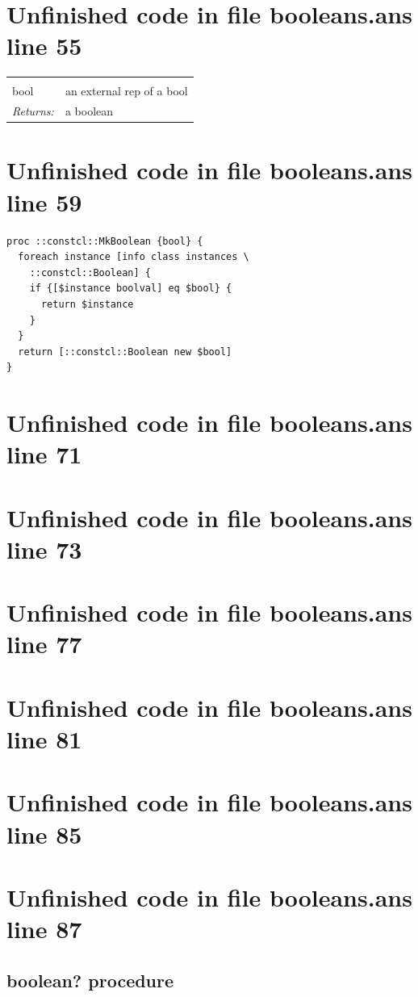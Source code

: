 \documentclass[twoside,9pt]{report}
\begin{document}
\section{Unfinished code in file booleans.ans line 55}
\noindent\begin{tabular}{ |p{1.9cm} p{8cm}| }
\hline
\rowcolor[HTML]{CCCCCC} \multicolumn{2}{|l|}{\bf MkBoolean (internal)} \\
bool & an external rep of a bool \\
\textit{Returns:} & a boolean \\
\hline
\end{tabular}
\section{Unfinished code in file booleans.ans line 59}
\begin{lstlisting}
proc ::constcl::MkBoolean {bool} {
  foreach instance [info class instances \
    ::constcl::Boolean] {
    if {[$instance boolval] eq $bool} {
      return $instance
    }
  }
  return [::constcl::Boolean new $bool]
}
\end{lstlisting}
\section{Unfinished code in file booleans.ans line 71}
\section{Unfinished code in file booleans.ans line 73}
\section{Unfinished code in file booleans.ans line 77}
\section{Unfinished code in file booleans.ans line 81}
\section{Unfinished code in file booleans.ans line 85}
\section{Unfinished code in file booleans.ans line 87}
\subsection{boolean? procedure}
\label{boolean?-procedure}
\end{document}
